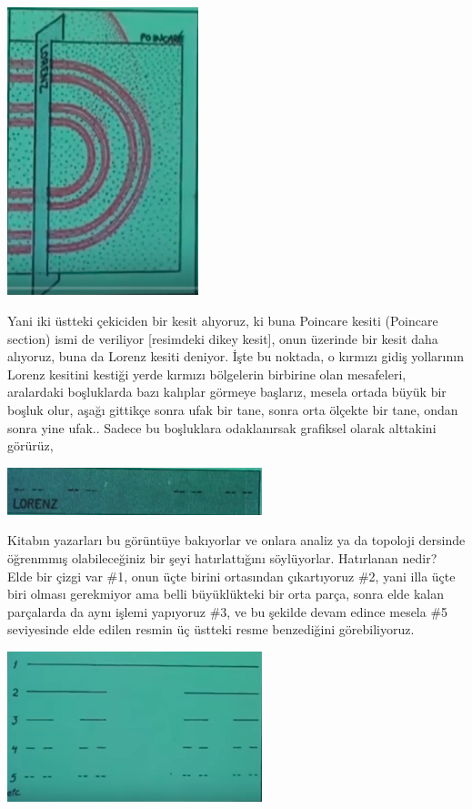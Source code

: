 \documentclass[12pt,fleqn]{article}\usepackage{../../common}
\begin{document}
\includegraphics[width=15em]{23_24.png}

Yani iki üstteki çekiciden bir kesit alıyoruz, ki buna Poincare kesiti (Poincare
section) ismi de veriliyor [resimdeki dikey kesit], onun üzerinde bir kesit daha
alıyoruz, buna da Lorenz kesiti deniyor. İşte bu noktada, o kırmızı gidiş
yollarının Lorenz kesitini kestiği yerde kırmızı bölgelerin birbirine olan
mesafeleri, aralardaki boşluklarda bazı kalıplar görmeye başlarız, mesela ortada
büyük bir boşluk olur, aşağı gittikçe sonra ufak bir tane, sonra orta ölçekte
bir tane, ondan sonra yine ufak.. Sadece bu boşluklara odaklanırsak grafiksel
olarak alttakini görürüz,

\includegraphics[width=20em]{23_25.png}

Kitabın yazarları bu görüntüye bakıyorlar ve onlara analiz ya da topoloji
dersinde öğrenmmış olabileceğiniz bir şeyi hatırlattığını
söylüyorlar. Hatırlanan nedir? Elde bir çizgi var \#1, onun üçte birini
ortasından çıkartıyoruz \#2, yani illa üçte biri olması gerekmiyor ama belli
büyüklükteki bir orta parça, sonra elde kalan parçalarda da aynı işlemi
yapıyoruz \#3, ve bu şekilde devam edince mesela \#5 seviyesinde elde edilen
resmin üç üstteki resme benzediğini görebiliyoruz. 

\includegraphics[width=20em]{23_27.png}
\end{document}
